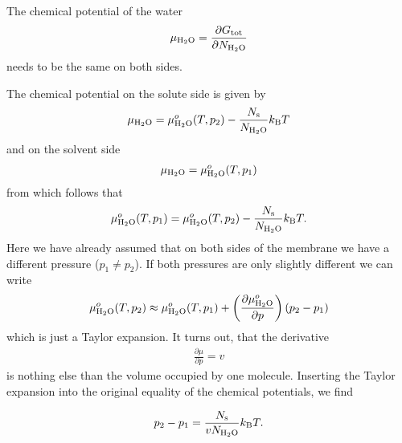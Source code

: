 \documentclass[letterpaper,10pt,english]{sphinxmanual}
\begin{document}
\sphinxAtStartPar
The chemical potential of the water
\begin{equation*}
\begin{split}\mu_{\rm H_2O}=\frac{\partial G_{\rm tot}}{\partial N_{\rm H_2O} }\end{split}
\end{equation*}
\sphinxAtStartPar
needs to be the same on both sides.

\sphinxAtStartPar
The chemical potential on the solute side is given by
\begin{equation*}
\begin{split}\mu_{\rm H_2O}=\mu_{\rm H_2O}^{o}(T,p_2)-\frac{N_{\rm s}}{N_{\rm H_2O}}k_{\rm B} T\end{split}
\end{equation*}
\sphinxAtStartPar
and on the solvent side
\begin{equation*}
\begin{split}\mu_{\rm H_2O}=\mu_{\rm H_2O}^{o}(T,p_1)\end{split}
\end{equation*}
\sphinxAtStartPar
from which follows that
\begin{equation*}
\begin{split}\mu_{\rm H_2O}^o(T,p_1)=\mu_{\rm H_2O}^o(T,p_2)-\frac{N_{\rm s}}{N_{\rm H_2O}} k_{\rm B} T.\end{split}
\end{equation*}
\sphinxAtStartPar
Here we have already assumed that on both sides of the membrane we have a different pressure (\(p_1\neq p_2\)). If both pressures are only slightly different we can write
\begin{equation*}
\begin{split}\mu_{\rm H_2O}^o(T,p_2)\approx \mu_{\rm H_2O}^o (T,p_1)+\left ( \frac{\partial \mu_{\rm H_2O}^o }{\partial p}\right )(p_2-p_1)\end{split}
\end{equation*}
\sphinxAtStartPar
which is just a Taylor expansion. It turns out, that the derivative
\begin{equation*}
\begin{split}\frac{\partial \mu }{\partial p}=v\end{split}
\end{equation*}
\sphinxAtStartPar
is nothing else than the volume occupied by one molecule. Inserting the Taylor expansion into the original equality of the chemical potentials, we find

\sphinxAtStartPar
\begin{equation}
p_2-p_1=\frac{N_{\rm s}}{v N_{\rm H_2O}} k_{\rm B} T.
\end{equation}
\end{document}
